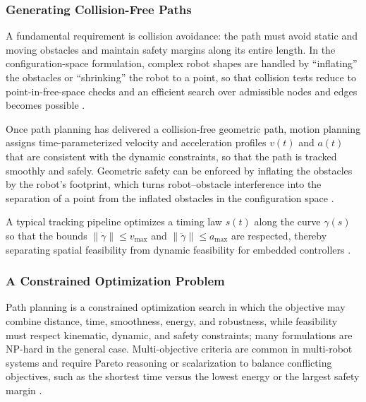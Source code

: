 \subsubsection{Generating Collision-Free Paths}

A fundamental requirement is collision avoidance: the path must avoid static and
moving obstacles and maintain safety margins along its entire length. In the
configuration-space formulation, complex robot shapes are handled by
``inflating'' the obstacles or ``shrinking'' the robot to a point, so that
collision tests reduce to point-in-free-space checks and an efficient search over
admissible nodes and edges becomes possible \cite{hamann2018swarm}.

Once path planning has delivered a collision-free geometric path, motion planning
assigns time-parameterized velocity and acceleration profiles $v(t)$ and $a(t)$
that are consistent with the dynamic constraints, so that the path is tracked
smoothly and safely. Geometric safety can be enforced by inflating the obstacles
by the robot's footprint, which turns robot--obstacle interference into the
separation of a point from the inflated obstacles in the configuration space
\cite{hamann2018swarm,nguyen2024swarm}.

A typical tracking pipeline optimizes a timing law $s(t)$ along the curve
$\gamma(s)$ so that the bounds $\|\dot{\gamma}\| \le v_{\max}$ and
$\|\ddot{\gamma}\| \le a_{\max}$ are respected, thereby separating spatial
feasibility from dynamic feasibility for embedded controllers \cite{nguyen2024swarm}.

\subsubsection{A Constrained Optimization Problem}

Path planning is a constrained optimization search in which the objective may
combine distance, time, smoothness, energy, and robustness, while feasibility
must respect kinematic, dynamic, and safety constraints; many formulations are
NP-hard in the general case. Multi-objective criteria are common in multi-robot
systems and require Pareto reasoning or scalarization to balance conflicting
objectives, such as the shortest time versus the lowest energy or the largest
safety margin \cite{hamann2018swarm,nguyen2024swarm}.

